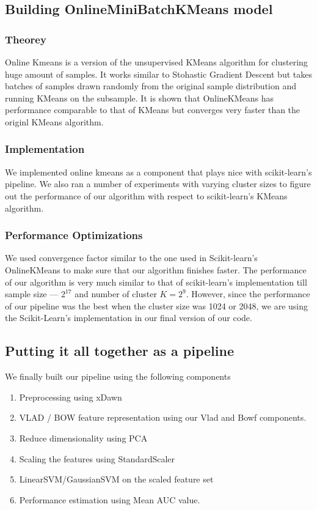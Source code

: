 \documentclass[final,leqno,onefignum,onetabnum]{siamltexmm}
\begin{document}
\subsection{Building OnlineMiniBatchKMeans model}
\subsubsection{Theorey}
Online Kmeans is a version of the unsupervised KMeans algorithm for clustering huge amount of samples\cite{art:online_kmeans}.  It works similar to Stohastic Gradient Descent but takes batches of samples drawn randomly from the original sample distribution and running KMeans on the subsample.
It is shown that OnlineKMeans has performance comparable to that of KMeans but converges very faster than the originl KMeans algorithm.
\subsubsection{Implementation}
We implemented online kmeans as a component that plays nice with scikit-learn's pipeline.  We also ran a number of experiments with varying cluster sizes to figure out the performance of our algorithm with respect to scikit-learn's KMeans algorithm.
\subsubsection{Performance Optimizations}
We used convergence factor similar to the one used in Scikit-learn's OnlineKMeans to make sure that our algorithm finishes faster.  The performance of our algorithm is very much similar to that of scikit-learn's implementation till sample size --- $2^{17}$ and number of cluster $K = 2^{9}$.
However, since the performance of our pipeline was the best when the cluster size was 1024 or 2048, we are using the Scikit-Learn's implementation in our final version of our code.

\subsection{Putting it all together as a pipeline}
We finally built our pipeline using the following components
  \begin{enumerate}
    \item Preprocessing using xDawn
    \item VLAD / BOW feature representation using our Vlad and Bowf components.
    \item Reduce dimensionality using PCA
    \item Scaling the features using StandardScaler
    \item LinearSVM/GaussianSVM on the scaled feature set
    \item Performance estimation using Mean AUC value.
  \end{enumerate}
\end{document}
